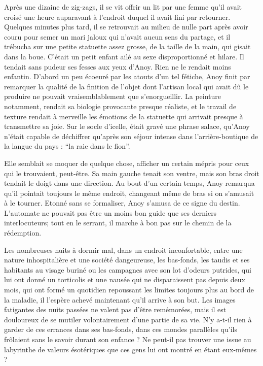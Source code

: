 Après une dizaine de zig-zags, il se vit offrir un lit par une femme
qu'il avait croisé une heure auparavant à l'endroit duquel il avait
fini par retourner. Quelques minutes plus tard, il se retrouvait au
milieu de nulle part après avoir couru pour semer un mari jaloux qui
n'avait aucun sens du partage, et il trébucha sur une petite statuette
assez grosse, de la taille de la main, qui gisait dans la
boue. C'était un petit enfant ailé au sexe disproportionné et
hilare. Il tendait sans pudeur ses fesses aux yeux d'Anoy. Rien ne le
rendait moins enfantin. D'abord un peu écoeuré par les atouts d'un tel
fétiche, Anoy finit par remarquer la qualité de la finition de l'objet
dont l'artisan local qui avait dû le produire ne pouvait
vraisemblablement que s'enorgueillir. La peinture notamment, rendait
sa biologie provocante presque réaliste, et le travail de texture
rendait à merveille les émotions de la statuette qui arrivait presque
à transmettre sa joie. Sur le socle d'icelle, était gravé une phrase
salace, qu'Anoy n'était capable de déchiffrer qu'après son séjour
intense dans l'arrière-boutique de la langue du pays : ``la raie dans
le fion''.

Elle semblait se moquer de quelque chose, afficher un certain mépris
pour ceux qui le trouvaient, peut-être. Sa main gauche tenait son
ventre, mais son bras droit tendait le doigt dans une direction. Au
bout d'un certain temps, Anoy remarqua qu'il pointait toujours le même
endroit, changeant même de bras si on s'amusait à le tourner. Etonné
sans se formaliser, Anoy s'amusa de ce signe du destin. L'automate ne
pouvait pas être un moins bon guide que ses derniers interlocuteurs;
tout en le serrant, il marche à bon pas sur le chemin de la
rédemption.

Les nombreuses nuits à dormir mal, dans un endroit inconfortable,
entre une nature inhospitalière et une société dangeureuse, les
bas-fonds, les taudis et ses habitants au visage buriné ou les
campagnes avec son lot d'odeurs putrides, qui lui ont donné un
torticolis et une nausée qui ne disparaissent pas depuis deux mois,
qui ont formé un quotidien repoussant les limites toujours plus au
bord de la maladie, il l'espère achevé maintenant qu'il arrive à son
but. Les images fatigantes des nuits passées ne valent pas d'être
remémorées, mais il est douloureux de se mutiler volontairement d'une
partie de sa vie. N'y a-t-il rien à garder de ces errances dans ses
bas-fonds, dans ces mondes parallèles qu'ils frôlaient sans le savoir
durant son enfance ? Ne peut-il pas trouver une issue au labyrinthe de
valeurs ésotériques que ces gens lui ont montré en étant eux-mêmes ?

